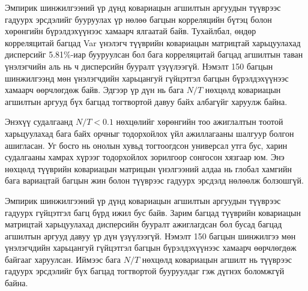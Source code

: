 Эмпирик шинжилгээний үр дүнд ковариацын агшилтын аргуудын түүврээс гадуурх эрсдэлийг бууруулах үр нөлөө багцын корреляцийн бүтэц болон хөрөнгийн бүрэлдэхүүнээс хамаарч ялгаатай байв. Тухайлбал, өндөр корреляцитай багцад Var үнэлэгч түүврийн ковариацын матрицтай харьцуулахад дисперсийг 5.81\%-иар бууруулсан бол бага корреляцитай багцад агшилтын таван үнэлэгчийн аль нь ч дисперсийн бууралт үзүүлээгүй. Нэмэлт 150 багцын шинжилгээнд мөн үнэлэгчдийн харьцангуй гүйцэтгэл багцын бүрэлдэхүүнээс хамаарч өөрчлөгдөж байв. Эдгээр үр дүн нь бага \(N/T\) нөхцөлд ковариацын агшилтын аргууд бүх багцад тогтвортой давуу байх албагүйг харуулж байна.

Энэхүү судалгаанд \(N/T<0.1\) нөхцөлийг хөрөнгийн тоо ажиглалтын тоотой харьцуулахад бага байх орчныг тодорхойлох үйл ажиллагааны шалгуур болгон ашигласан. Уг босго нь онолын хувьд тогтоогдсон универсал утга бус, харин судалгааны хамрах хүрээг тодорхойлох зорилгоор сонгосон хязгаар юм. Энэ нөхцөлд түүврийн ковариацын матрицын үнэлгээний алдаа нь глобал хамгийн бага вариацтай багцын жин болон түүврээс гадуурх эрсдэлд нөлөөлж болзошгүй.

Эмпирик шинжилгээний үр дүнд ковариацын агшилтын аргуудын түүврээс гадуурх гүйцэтгэл багц бүрд ижил бус байв. Зарим багцад түүврийн ковариацын матрицтай харьцуулахад дисперсийн бууралт ажиглагдсан бол бусад багцад агшилтын аргууд давуу үр дүн үзүүлээгүй. Нэмэлт 150 багцын шинжилгээ мөн үнэлэгчдийн харьцангуй гүйцэтгэл багцын бүрэлдэхүүнээс хамаарч өөрчлөгдөж байгааг харуулсан. Иймээс бага \(N/T\) нөхцөлд ковариацын агшилт нь түүврээс гадуурх эрсдэлийг бүх багцад тогтвортой бууруулдаг гэж дүгнэх боломжгүй байна.